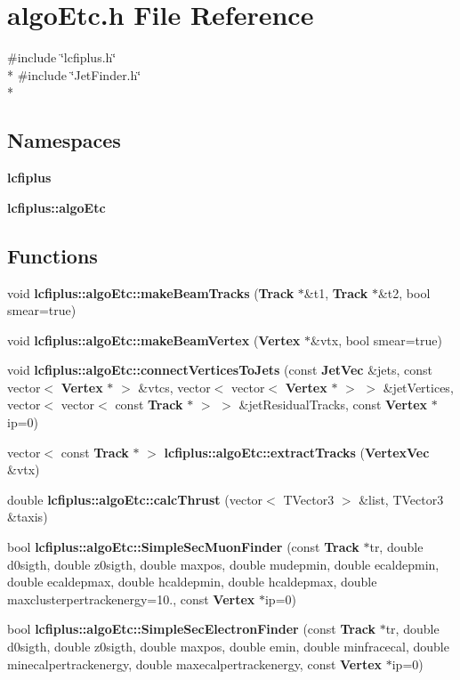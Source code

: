 \section{algo\-Etc.\-h File Reference}
\label{algoEtc_8h}
{\ttfamily \#include \char`\"{}lcfiplus.\-h\char`\"{}}\\*
{\ttfamily \#include \char`\"{}Jet\-Finder.\-h\char`\"{}}\\*
\subsection*{Namespaces}
\begin{DoxyCompactItemize}
\item 
{\bf lcfiplus}
\item 
{\bf lcfiplus\-::algo\-Etc}
\end{DoxyCompactItemize}
\subsection*{Functions}
\begin{DoxyCompactItemize}
\item 
void {\bf lcfiplus\-::algo\-Etc\-::make\-Beam\-Tracks} ({\bf Track} $\ast$\&t1, {\bf Track} $\ast$\&t2, bool smear=true)
\item 
void {\bf lcfiplus\-::algo\-Etc\-::make\-Beam\-Vertex} ({\bf Vertex} $\ast$\&vtx, bool smear=true)
\item 
void {\bf lcfiplus\-::algo\-Etc\-::connect\-Vertices\-To\-Jets} (const {\bf Jet\-Vec} \&jets, const vector$<$ {\bf Vertex} $\ast$ $>$ \&vtcs, vector$<$ vector$<$ {\bf Vertex} $\ast$ $>$ $>$ \&jet\-Vertices, vector$<$ vector$<$ const {\bf Track} $\ast$ $>$ $>$ \&jet\-Residual\-Tracks, const {\bf Vertex} $\ast$ip=0)
\item 
vector$<$ const {\bf Track} $\ast$ $>$ {\bf lcfiplus\-::algo\-Etc\-::extract\-Tracks} ({\bf Vertex\-Vec} \&vtx)
\item 
double {\bf lcfiplus\-::algo\-Etc\-::calc\-Thrust} (vector$<$ T\-Vector3 $>$ \&list, T\-Vector3 \&taxis)
\item 
bool {\bf lcfiplus\-::algo\-Etc\-::\-Simple\-Sec\-Muon\-Finder} (const {\bf Track} $\ast$tr, double d0sigth, double z0sigth, double maxpos, double mudepmin, double ecaldepmin, double ecaldepmax, double hcaldepmin, double hcaldepmax, double maxclusterpertrackenergy=10., const {\bf Vertex} $\ast$ip=0)
\item 
bool {\bf lcfiplus\-::algo\-Etc\-::\-Simple\-Sec\-Electron\-Finder} (const {\bf Track} $\ast$tr, double d0sigth, double z0sigth, double maxpos, double emin, double minfracecal, double minecalpertrackenergy, double maxecalpertrackenergy, const {\bf Vertex} $\ast$ip=0)
\end{DoxyCompactItemize}
